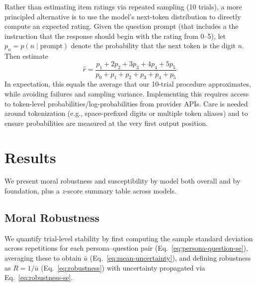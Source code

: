 \documentclass{article}
\begin{document}
Rather than estimating item ratings via repeated sampling (10 trials), a more principled alternative is to use the model’s next-token distribution to directly compute an expected rating. Given the question prompt (that includes a the instruction that the response should begin with the rating from 0--5), let \(p_n = p(n\mid\text{prompt})\) denote the probability that the next token is the digit \(n\). Then estimate
\begin{equation}
  \hat r = \frac{p_1+2p_2+3p_3+4p_4+5p_5}{p_0+p_1+p_2+p_3+p_4+p_5}
\end{equation}
In expectation, this equals the average that our 10-trial procedure approximates, while avoiding failures and sampling variance. Implementing this requires access to token-level probabilities/log-probabilities from provider APIs. Care is needed around tokenization (e.g., space-prefixed digits or multiple token aliases) and to ensure probabilities are measured at the very first output position.



\section{Results}

We present moral robustness and susceptibility by model both overall and by foundation, plus a $z$-score summary table across models.



\subsection{Moral Robustness}
We quantify trial-level stability by first computing the sample standard deviation across repetitions for each persona–question pair (Eq.~\ref{eq:persona-question-se}), averaging these to obtain \(\bar{u}\) (Eq.~\ref{eq:mean-uncertainty}), and defining robustness as \(R = 1/\bar{u}\) (Eq.~\ref{eq:robustness}) with uncertainty propagated via Eq.~\ref{eq:robustness-se}.
\end{document}
